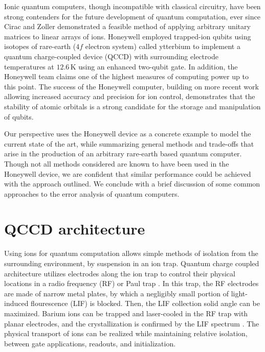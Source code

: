 \documentclass[12pt,a4paper]{amsart}
\numberwithin{equation}{section}
\theoremstyle{plain}
\theoremstyle{definition}
\begin{document}
Ionic quantum computers, though incompatible with classical circuitry, have been strong contenders for the future development of quantum computation, ever since Cirac and Zoller demonstrated a feasible method of applying arbitrary unitary matrices to linear arrays of ions. \cite{fundQuanIoni} Honeywell employed  trapped-ion qubits using isotopes of rare-earth ($4f$ electron system) called ytterbium  \cite{rareEartFund} to implement a quantum charge-coupled device (QCCD) with surrounding electrode temperatures at $12.6\,$K using an enhanced two-qubit gate. In addition, the Honeywell team claims one of the highest measures of computing power up to this point.\cite{honeywell} The success of the Honeywell computer, building on more recent work allowing increased accuracy and precision for ion control, demonstrates that the stability of atomic orbitals is a strong candidate for the storage and manipulation of qubits.

Our perspective uses the Honeywell device as a concrete example to model the current state of the art, while summarizing general methods and trade-offs that arise in the production of an arbitrary rare-earth based quantum computer. Though not all methods considered are known to have been used in the Honeywell device, we are confident that similar performance could be achieved with the approach outlined. We conclude with a brief discussion of some common approaches to the error analysis of quantum computers.

\section{QCCD architecture}

Using ions for quantum computation allows simple methods of isolation from the surrounding environment, by suspension in an ion trap. Quantum charge coupled architecture utilizes electrodes along the ion trap to control their physical locations in a radio frequency (RF) or Paul trap \cite{compArchLarg}. In this trap, the RF electrodes are made of narrow metal plates, by which a negligibly small portion of light-induced flourescence (LIF) is blocked. Then, the LIF collection solid angle can be maximized. Barium ions can be trapped and laser-cooled in the RF trap with planar electrodes, and the crystallization is confirmed by the LIF spectrum \cite{ioniReviArt,miscQuanPap2}. The physical transport of ions can be realized while maintaining relative isolation, between gate applications, readouts, and initialization.
\end{document}
